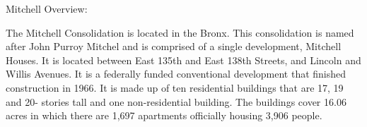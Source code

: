 Mitchell Overview:     

   

The Mitchell Consolidation is located in the Bronx. This consolidation is named after John Purroy Mitchel and is comprised of a single development, Mitchell Houses. It is located between East 135th and East 138th Streets, and Lincoln and Willis Avenues. It is a federally funded conventional development that finished construction in 1966. It is made up of ten residential buildings that are 17, 19 and 20- stories tall and one non-residential building. The buildings cover 16.06 acres in which there are 1,697 apartments officially housing 3,906 people.
